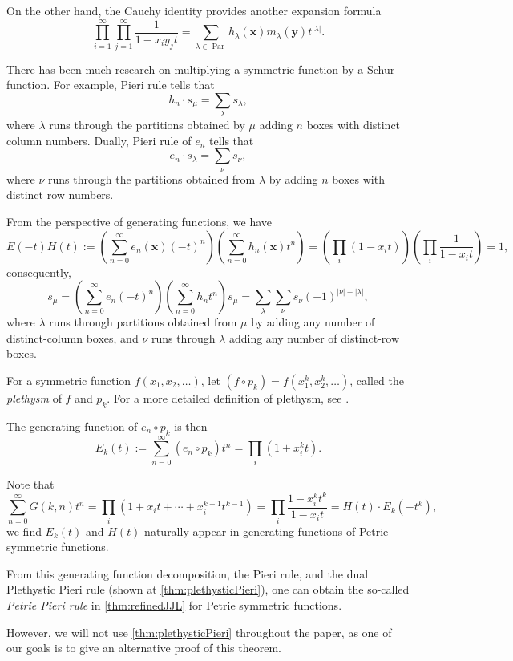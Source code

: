 \documentclass[pdflatex,sn-mathphys-num]{sn-jnl}%
\theoremstyle{thmstyleone}%
\theoremstyle{thmstyletwo}%
\theoremstyle{thmstylethree}%
\numberwithin{equation}{section}
\DeclareMathOperator{\Par}{Par}
\begin{document}
	On the other hand, the Cauchy identity provides another expansion formula
	\[\prod_{i=1}^{\infty}\prod_{j=1}^\infty \frac{1}{1-x_iy_jt} = \sum_{\lambda\in \Par} h_\lambda(\mathbf{x})m_{\lambda}(\mathbf{y})t^{|\lambda|}.\]

    There has been much research on multiplying a symmetric function by a Schur function. For example, Pieri rule tells that 
    \[h_n\cdot s_\mu = \sum_{\lambda} s_\lambda,\]
    where $\lambda$ runs through the partitions obtained by $\mu$ adding $n$ boxes with distinct column numbers. Dually, Pieri rule of $e_n$ tells that
    \[e_n\cdot s_\lambda = \sum_{\nu} s_\nu,\]
    where $\nu$ runs through the partitions obtained from $\lambda$ by adding $n$ boxes with distinct row numbers. 
    
    From the perspective of generating functions, we have
    \[E(-t)H(t):= \left(\sum_{n=0}^\infty e_n(\mathbf{x})(-t)^n\right)\left(\sum_{n=0}^\infty h_n(\mathbf{x})t^n\right)
    =\left(\prod_i (1-x_it)\right)\left(\prod_i \frac{1}{1-x_it}\right)=1,\]
    consequently,
    \[s_\mu = \left(\sum_{n=0}^\infty e_n(-t)^n\right)\left(\sum_{n=0}^\infty h_nt^n\right)s_\mu = \sum_\lambda\sum_\nu s_\nu (-1)^{|\nu|-|\lambda|},\]
    where $\lambda$ runs through partitions obtained from $\mu$ by adding any number of distinct-column boxes, and $\nu$ runs through $\lambda$ adding any number of distinct-row boxes.
    
    For a symmetric function $f(x_1,x_2,\dotsc)$, let $(f\circ p_k)= f(x_1^k,x_2^k,\dotsc)$, called the \emph{plethysm} of $f$ and $p_k$. For a more detailed definition of plethysm, see \cite[Sec. 8]{macdonald1998symmetric}.
        
        The generating function of $e_n\circ p_k$ is then \[E_k(t):=\sum_{n=0}^\infty (e_n\circ p_k)t^n = \prod_{i} (1+x_i^kt).\] 
        
        Note that 
        \[\sum_{n=0}^\infty G(k,n) t^n = \prod_{i} (1+x_it+\cdots+x_i^{k-1}t^{k-1}) = \prod_i \frac{1-x_i^kt^k}{1-x_it}= H(t)\cdot E_k(-t^k),\]
        we find $E_k(t)$ and $H(t)$ naturally appear in generating functions of Petrie symmetric functions.

        From this generating function decomposition, the Pieri rule, and the dual Plethystic Pieri rule (shown at \cref{thm:plethysticPieri}), one can obtain the so-called \textit{Petrie Pieri rule} in \cref{thm:refinedJJL} for Petrie symmetric functions.
        
        However, we will not use \cref{thm:plethysticPieri} throughout the paper, as one of our goals is to give an alternative proof of this theorem.
	
\end{document}
